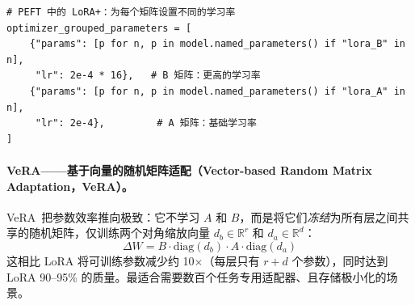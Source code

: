 \begin{lstlisting}[style=pythonstyle]
# PEFT 中的 LoRA+：为每个矩阵设置不同的学习率
optimizer_grouped_parameters = [
    {"params": [p for n, p in model.named_parameters() if "lora_B" in n],
     "lr": 2e-4 * 16},   # B 矩阵：更高的学习率
    {"params": [p for n, p in model.named_parameters() if "lora_A" in n],
     "lr": 2e-4},         # A 矩阵：基础学习率
]
\end{lstlisting}

\paragraph{VeRA——基于向量的随机矩阵适配（Vector-based Random Matrix Adaptation，VeRA）。}
\label{vera-vector-based-random-matrix-adaptation.}

VeRA~\cite{kopiczko2024vera}把参数效率推向极致：它不学习 $A$ 和 $B$，而是将它们\emph{冻结}为所有层之间共享的随机矩阵，仅训练两个对角缩放向量 $d_b \in \mathbb{R}^r$ 和 $d_a \in \mathbb{R}^d$：
\[
\Delta W = B \cdot \text{diag}(d_b) \cdot A \cdot \text{diag}(d_a)
\]
这相比 LoRA 将可训练参数减少约 10$\times$（每层只有 $r + d$ 个参数），同时达到 LoRA 90--95\% 的质量。最适合需要数百个任务专用适配器、且存储极小化的场景。

